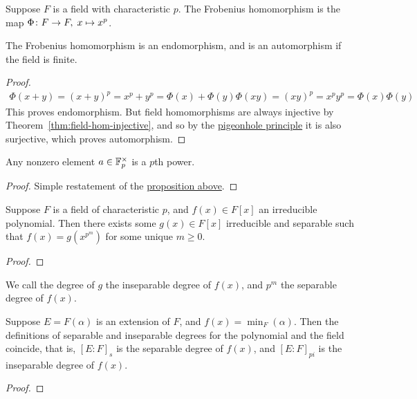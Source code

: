 \begin{definition}
    Suppose \(F\) is a field with characteristic \(p\).
    The Frobenius homomorphism is the map \(\Phi\colon F\to F,\;x\mapsto x^p\).
\end{definition}
\begin{proposition}\label{prop:frobenius-hom}
    The Frobenius homomorphism is an endomorphism,
    and is an automorphism if the field is finite.
\end{proposition}
\begin{proof}
    \begin{gather*}
        \Phi(x+y) = {(x+y)}^p = x^p + y^p = \Phi(x) + \Phi(y)
        \Phi(xy) = {(xy)}^p = x^p y^p = \Phi(x)\Phi(y)
    \end{gather*}
    This proves endomorphism.
    But field homomorphisms are always injective
    by Theorem~\ref{thm:field-hom-injective},
    and so by the \hyperref[thm:pigeonhole]{pigeonhole principle}
    it is also surjective,
    which proves automorphism.
\end{proof}
\begin{corollary}
    Any nonzero element \(a \in \mathbb{F}_p^\times\) is a \(p\)th power.
\end{corollary}
\begin{proof}
    Simple restatement of the \hyperref[prop:frobenius-hom]{proposition above}.
\end{proof}

\begin{proposition}\label{prop:separable-power-polynomial}
    Suppose \(F\) is a field of characteristic \(p\),
    and \(f(x) \in F[x]\) an irreducible polynomial.
    Then there exists some \(g(x) \in F[x]\) irreducible and separable
    such that \(f(x) = g(x^{p^m})\) for some unique \(m \geq 0\).
\end{proposition}
\begin{proof}
\end{proof}
\begin{definition}
    We call the degree of \(g\) the inseparable degree of \(f(x)\),
    and \(p^m\) the separable degree of \(f(x)\).
\end{definition}
\begin{proposition}
    Suppose \(E = F(\alpha)\) is an extension of \(F\),
    and \(f(x) = \min_F(\alpha)\).
    Then the definitions of separable and inseparable degrees
    for the polynomial and the field coincide,
    that is, \({[E:F]}_s\) is the separable degree of \(f(x)\),
    and \({[E:F]}_{pi}\) is the inseparable degree of \(f(x)\).
\end{proposition}
\begin{proof}
\end{proof}


